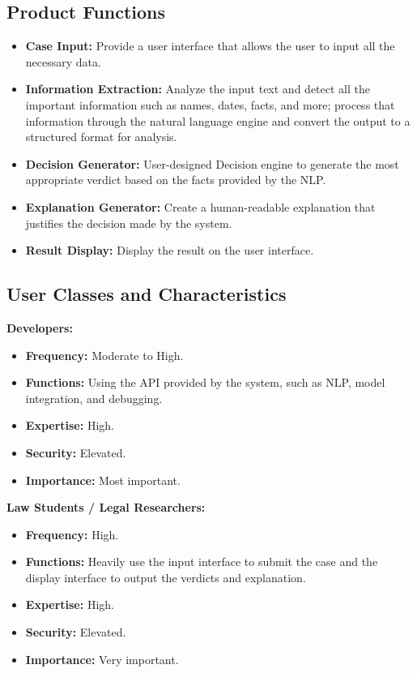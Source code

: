\documentclass[12pt]{article}
\begin{document}
\subsection{Product Functions}

\begin{itemize}
    \item \textbf{Case Input:} Provide a user interface that allows the user to input all the necessary data.
    \item \textbf{Information Extraction:} Analyze the input text and detect all the important information such as names, dates, facts, and more; process that information through the natural language engine and convert the output to a structured format for analysis.
    \item \textbf{Decision Generator:} User-designed Decision engine to generate the most appropriate verdict based on the facts provided by the NLP.
    \item \textbf{Explanation Generator:} Create a human-readable explanation that justifies the decision made by the system.
    \item \textbf{Result Display:} Display the result on the user interface.
\end{itemize}

\subsection{User Classes and Characteristics}

\textbf{Developers:}
\begin{itemize}
    \item \textbf{Frequency:} Moderate to High.
    \item \textbf{Functions:} Using the API provided by the system, such as NLP, model integration, and debugging.
    \item \textbf{Expertise:} High.
    \item \textbf{Security:} Elevated.
    \item \textbf{Importance:} Most important.
\end{itemize}

\textbf{Law Students / Legal Researchers:}
\begin{itemize}
    \item \textbf{Frequency:} High.
    \item \textbf{Functions:} Heavily use the input interface to submit the case and the display interface to output the verdicts and explanation.
    \item \textbf{Expertise:} High.
    \item \textbf{Security:} Elevated.
    \item \textbf{Importance:} Very important.
\end{itemize}
\end{document}
